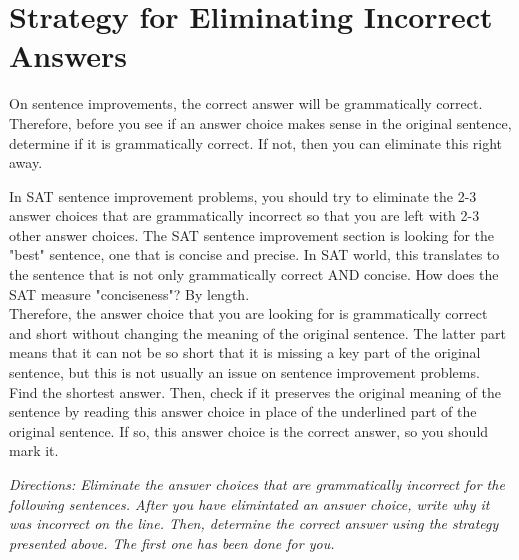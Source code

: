 \section{Strategy for Eliminating Incorrect Answers}

On sentence improvements, the correct answer will be grammatically correct. Therefore, before
you see if an answer choice makes sense in the original sentence, determine if it is grammatically
correct. If not, then you can eliminate this right away.

In SAT sentence improvement problems, you should try to eliminate the 2-3 answer choices that are grammatically incorrect so that you are left with 2-3 other answer choices. The SAT sentence improvement section is looking for the "best" sentence, one that is concise and precise. In SAT world, this translates to the sentence that is not only grammatically correct AND concise. How does the SAT measure "conciseness"? By length. \\

Therefore, the answer choice that you are looking for is grammatically correct and short without changing the meaning of the original sentence. The latter part means that it can not be so short that it is missing a key part of the original sentence,
but this is not usually an issue on sentence improvement problems. \\

Find the shortest answer. Then, check if it preserves the original meaning of the sentence by reading this answer choice in place of the underlined part of the original sentence. If so, this answer choice is the correct answer, so you should mark it.

\bigskip
\textit{Directions: Eliminate the answer choices that are grammatically incorrect for the following sentences. After you have elimintated an answer choice, write why it was incorrect on the line. Then, determine the correct answer using the strategy presented above. The first one has been done for you.}

